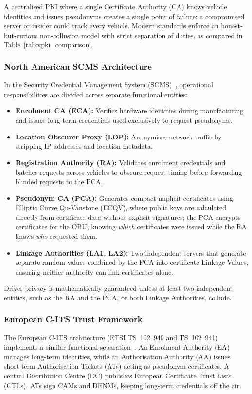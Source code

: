 A centralised PKI where a single Certificate Authority (CA) knows vehicle identities and issues pseudonyms creates a single point of failure; a compromised server or insider could track every vehicle.
Modern standards enforce an honest-but-curious non-collusion model with strict separation of duties, as compared in Table~\ref{tab:vpki_comparison}.

\subsubsection{North American SCMS Architecture}
In the Security Credential Management System (SCMS)~\cite{brecht2018scms}, operational responsibilities are divided across separate functional entities:
\begin{itemize}
    \item \textbf{Enrolment CA (ECA):} Verifies hardware identities during manufacturing and issues long-term credentials used exclusively to request pseudonyms.
    \item \textbf{Location Obscurer Proxy (LOP):} Anonymises network traffic by stripping IP addresses and location metadata.
    \item \textbf{Registration Authority (RA):} Validates enrolment credentials and batches requests across vehicles to obscure request timing before forwarding blinded requests to the PCA.
    \item \textbf{Pseudonym CA (PCA):} Generates compact implicit certificates using Elliptic Curve Qu-Vanstone (ECQV), where public keys are calculated directly from certificate data without explicit signatures; the PCA encrypts certificates for the OBU, knowing \textit{which} certificates were issued while the RA knows \textit{who} requested them.
    \item \textbf{Linkage Authorities (LA1, LA2):} Two independent servers that generate separate random values combined by the PCA into certificate Linkage Values, ensuring neither authority can link certificates alone.
\end{itemize}
Driver privacy is mathematically guaranteed unless at least two independent entities, such as the RA and the PCA, or both Linkage Authorities, collude.

\subsubsection{European C-ITS Trust Framework}
The European C-ITS architecture (ETSI TS~102~940 and TS~102~941) implements a similar functional separation~\cite{haidar2019risk, yoshizawa2023new}.
An Enrolment Authority (EA) manages long-term identities, while an Authorisation Authority (AA) issues short-term Authorisation Tickets (ATs) acting as pseudonym certificates.
A central Distribution Centre (DC) publishes European Certificate Trust Lists (CTLs).
ATs sign CAMs and DENMs, keeping long-term credentials off the air.

